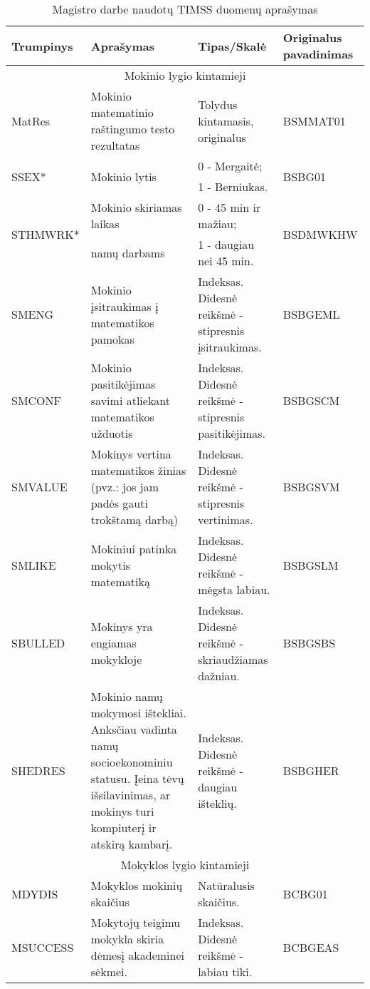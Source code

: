 \documentclass[12pt,a4paper]{article}
\begin{document}
\begin{small}
\begin{longtable}{| p{} | p{5cm} | p{5cm} | p{} |}
\caption{Magistro darbe naudotų TIMSS duomenų aprašymas}
\label{table:duom}\\
\hline
Trumpinys & Aprašymas & Tipas/Skalė & Originalus pavadinimas \\ \hline
\multicolumn{4}{|c|}{Mokinio lygio kintamieji} \\
\hline
MatRes & Mokinio matematinio raštingumo testo rezultatas & Tolydus kintamasis, originalus & BSMMAT01\\ \hline
\multirow{2}{*}{SSEX*} & \multirow{2}{*}{Mokinio lytis} & 0 - Mergaitė; & \multirow{2}{*}{BSBG01}\\
& & 1 - Berniukas. & \\ \hline
\multirow{2}{*}{STHMWRK*} & Mokinio skiriamas laikas & 0 - 45 min ir mažiau; & \multirow{2}{*}{BSDMWKHW}\\
& namų darbams & 1 - daugiau nei 45 min. & \\ \hline
SMENG & Mokinio įsitraukimas į matematikos pamokas & Indeksas. Didesnė reikšmė - stipresnis įsitraukimas. & BSBGEML\\ \hline
SMCONF & Mokinio pasitikėjimas savimi atliekant matematikos užduotis & Indeksas. Didesnė reikšmė - stipresnis pasitikėjimas. & BSBGSCM\\ \hline
SMVALUE & Mokinys vertina matematikos žinias (pvz.: jos jam padės gauti trokštamą darbą) & Indeksas. Didesnė reikšmė - stipresnis vertinimas. & BSBGSVM\\ \hline
SMLIKE & Mokiniui patinka mokytis matematiką & Indeksas. Didesnė reikšmė - mėgsta labiau. &BSBGSLM\\ \hline
SBULLED & Mokinys yra engiamas mokykloje & Indeksas. Didesnė reikšmė - skriaudžiamas dažniau. &BSBGSBS\\ \hline
SHEDRES & Mokinio namų mokymosi ištekliai. Anksčiau vadinta namų socioekonominiu statusu. Įeina tėvų išsilavinimas, ar mokinys turi kompiuterį ir atskirą kambarį. & Indeksas. Didesnė reikšmė - daugiau išteklių. &BSBGHER\\ \hline
\multicolumn{4}{|c|}{Mokyklos lygio kintamieji} \\
\hline
MDYDIS & Mokyklos mokinių skaičius & Natūralusis skaičius. & BCBG01\\ \hline
MSUCCESS & Mokytojų teigimu mokykla skiria dėmesį akademinei sėkmei. & Indeksas. Didesnė reikšmė - labiau tiki. &BCBGEAS\\ \hline

\end{longtable}
\end{small}
\end{document}
